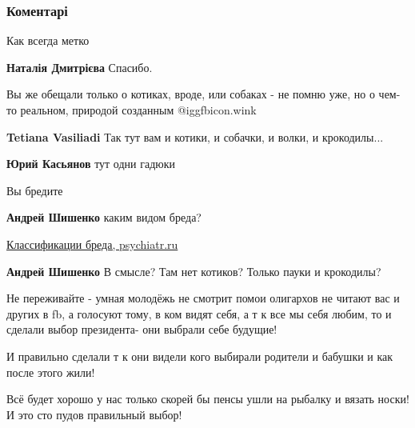  
 
 
 
 
\subsubsection{Коментарі}
\label{sec:26_11_2021.fb.kasjanov_jurij.kiev.1.zelenskii_putchisty.cmt}

\begin{itemize} %
Как всегда метко


\textbf{Наталія Дмитрієва} Спасибо.

Вы же обещали только о котиках, вроде, или собаках - не помню уже, но о чем-то реальном, природой созданным @igg{fbicon.wink} 

\begin{itemize} %

\textbf{Tetiana Vasiliadi} Так тут вам и котики, и собачки, и волки, и крокодилы...

\textbf{Юрий Касьянов} тут одни гадюки

Вы бредите

\textbf{Андрей Шишенко} каким видом бреда? 

\href{https://psychiatr.ru/education/slide/347}{%
Классификации бреда, psychiatr.ru%
}

\textbf{Андрей Шишенко} В смысле? Там нет котиков? Только пауки и крокодилы?
\end{itemize} %


Не переживайте - умная молодёжь не смотрит помои олигархов не читают вас и
других в fb, а голосуют тому, в ком видят себя, а т к все мы себя любим, то и
сделали выбор президента- они выбрали себе будущие!

И правильно сделали т к они видели кого выбирали родители и бабушки и как после
этого жили!

Всё будет хорошо у нас только скорей бы пенсы ушли на рыбалку и вязать носки! И
это сто пудов правильный выбор!


\end{itemize}
